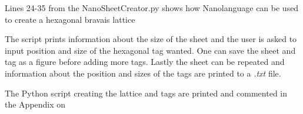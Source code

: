 \begin{listing}
 \inputminted[python3=true,bgcolor=Black,linenos=true,firstline=24,lastline=35]{python}{VNL/PythonScripts/NanoSheetCreator.py}
 \caption{Lines 24-35 from the NanoSheetCreator.py shows how Nanolanguage can be used to create a hexagonal bravais lattice}
 \label{listing1}
\end{listing}
\twocolumngrid
The script prints information about the size of the sheet and the user is asked to input position and size of the hexagonal tag wanted. One can save the sheet and tag as a figure before adding more tags. Lastly the sheet can be repeated and information about the position and sizes of the tags are printed to a \textit{.txt} file.

The Python script creating the lattice and tags are printed and commented in the Appendix on 
